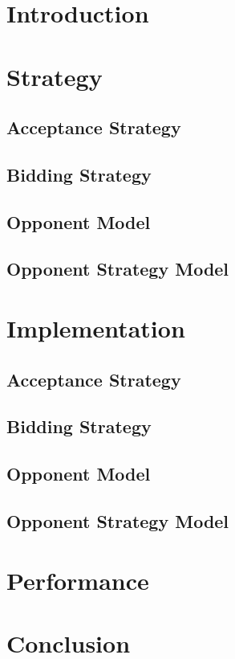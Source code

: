 \documentclass[a4paper,10pt]{article}
\title{\maintitle\\\subtitle}
\author{\authorbd\\\authoroh\\\authortr\\\authoras\\\authortv}
\date{\today}
\begin{document}
\maketitle

\section{Introduction}

\section{Strategy}
\subsection{Acceptance Strategy}
\subsection{Bidding Strategy}
\subsection{Opponent Model}
\subsection{Opponent Strategy Model}

\section{Implementation}
\subsection{Acceptance Strategy}
\subsection{Bidding Strategy}
\subsection{Opponent Model}
\subsection{Opponent Strategy Model}

\section{Performance}

\section{Conclusion}
\end{document}
